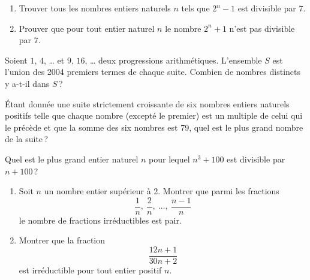 \begin{exo}[IMO 1964 1.]
	\begin{enumerate}
		\item Trouver tous les nombres entiers naturels $n$ tels que $2^n - 1$ est divisible par $7$.
		\item Prouver que pour tout entier naturel $n$ le nombre $2^n + 1$ n'est pas divisible par $7$.
	\end{enumerate}
\end{exo}

\begin{exo}
	Soient $1$, $4$, \ldots{} et $9$, $16$, \ldots{} deux progressions arithm\'etiques.
	L'ensemble $S$ est l'union des 2004 premiers termes de chaque suite.
	Combien de nombres distincts y a-t-il dans $S$\,?
\end{exo}

\begin{exo}
		\'Etant donn\'ee une suite strictement croissante de six nombres entiers naturels positifs telle que 
		chaque nombre (except\'e le premier) est un multiple de celui qui le pr\'ec\`ede et que la somme 
	des six nombres est 79, quel est le plus grand nombre de la suite\,?
\end{exo}

\begin{exo}
	Quel est le plus grand entier naturel $n$ pour lequel $n^3 + 100$ est divisible par $n + 100$\,?
\end{exo}

\begin{exo}
	\begin{enumerate}
		\item Soit $n$ un nombre entier sup\'erieur \`a 2.
				Montrer que parmi les fractions 
			\[
				\frac{1}{n},\ \frac{2}{n},\	\ldots ,\ \frac{n-1}{n}
			\]
				le nombre de fractions irr\'eductibles est pair.
		\item Montrer que la fraction 
			\[
				\frac{12 n + 1}{30 n + 2}
			\]
				est irr\'eductible pour tout entier positif $n$.
	\end{enumerate}
\end{exo}

